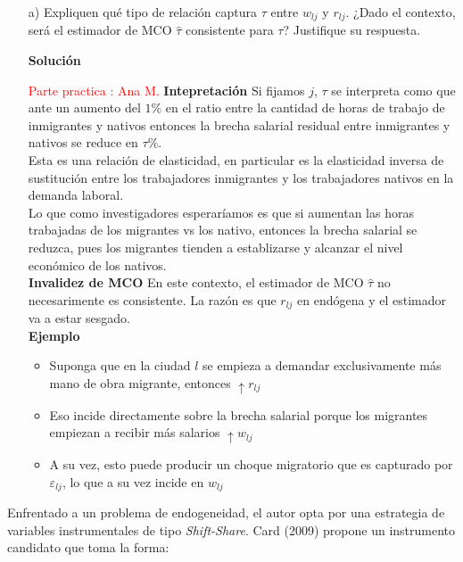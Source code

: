 \documentclass[a4paper, answers, addpoints, 11pt]{exam}
\newenvironment{solucion}{%
  \begin{mdframed}[
    backgroundcolor=blue!5,    %
    linecolor=blue!50,          %
    linewidth=2pt,              %
    leftmargin=10pt,            %
    rightmargin=8pt,           %
    topline=true,              %
    bottomline=true,            %
    roundcorner=10pt,           %
    innerleftmargin=10pt,       %
    innerrightmargin=10pt,      %
    innerbottommargin=10pt,     %
    innertopmargin=10pt         %
  ]%
  \begin{tcolorbox}[colframe=blue!50!black, colback=blue!50, coltitle=white, sharp corners=all, boxrule=1mm, width=\textwidth, halign=left, valign=center, top=0mm, bottom=0mm, left=0mm, right=0mm] \textbf{Solución} \end{tcolorbox} }{\end{mdframed}}
\begin{document}
 
\begin{itemize}

   

    \item[a)] Expliquen qué tipo de relación captura $\tau$ entre $w_{lj}$ y $r_{lj}$. ¿Dado el contexto, será el estimador de MCO $\hat{\tau}$ consistente para $\tau$? Justifique su respuesta.\\
    \begin{solucion}
    \textcolor{red}{Parte practica : 
    Ana M.}
    \textbf{Intepretación}
Si fijamos $j$, $\tau$ se interpreta como que ante un aumento del $1\%$ en el ratio entre la cantidad de horas de trabajo de inmigrantes y nativos entonces la brecha salarial residual entre inmigrantes y nativos se reduce en $\tau\%$. \\

Esta es una relación de elasticidad, en particular es la elasticidad inversa de sustitución entre los trabajadores inmigrantes y los trabajadores nativos en la demanda laboral. \\

Lo que como investigadores esperaríamos es que si aumentan las horas trabajadas de los migrantes vs los nativo, entonces la brecha salarial se reduzca, pues los migrantes tienden a establizarse y alcanzar el nivel económico de los nativos.\\

 \textbf{Invalidez de MCO}
En este contexto, el estimador de MCO $\hat{\tau}$ no necesarimente es consistente. La razón es que $r_{lj}$ en endógena y el estimador va a estar sesgado.\\ 

\textbf{Ejemplo}
\begin{itemize}
    \item Suponga que en la ciudad $l$ se empieza a demandar exclusivamente más mano de obra migrante, entonces $\uparrow r_{lj}$ 
    \item Eso incide directamente sobre la brecha salarial porque los migrantes empiezan a recibir más salarios $\uparrow w_{lj}$
    \item A su vez, esto puede producir un choque migratorio que es capturado por $\varepsilon_{lj}$, lo que a su vez incide en $w_{lj}$
\end{itemize}
\end{solucion}
\end{itemize}   

Enfrentado a un problema de endogeneidad, el autor opta por una estrategia de variables instrumentales de tipo \textit{Shift-Share}. Card (2009) propone un instrumento candidato que toma la forma:
\end{document}
